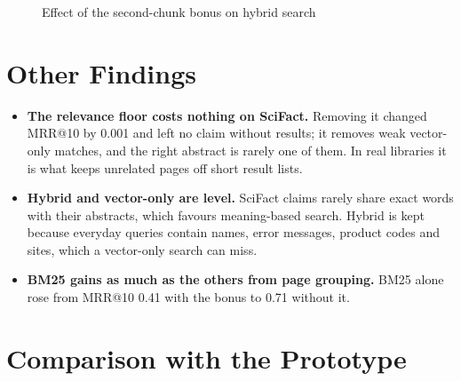 \begin{figure}[H]
\centering
{}
\caption{Effect of the second-chunk bonus on hybrid search}
\label{fig:sweep}
\end{figure}

\section{Other Findings}

\begin{itemize}
  \item \textbf{The relevance floor costs nothing on SciFact.} Removing it
  changed MRR@10 by 0.001 and left no claim without results; it removes
  weak vector-only matches, and the right abstract is rarely one of them. In
  real libraries it is what keeps unrelated pages off short result lists.
  \item \textbf{Hybrid and vector-only are level.} SciFact claims rarely
  share exact words with their abstracts, which favours meaning-based
  search. Hybrid is kept because everyday queries contain names, error
  messages, product codes and sites, which a vector-only search can miss.
  \item \textbf{BM25 gains as much as the others from page grouping.} BM25
  alone rose from MRR@10 0.41 with the bonus to 0.71 without it.
\end{itemize}

\section{Comparison with the Prototype}

